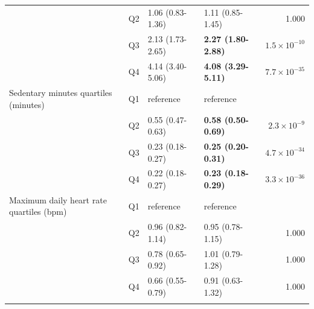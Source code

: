 \documentclass[11pt]{article}
\begin{document}
\begin{longtable}{@{}p{5.2cm}c p{3.0cm} p{3.0cm} r@{}}
 & Q2 & 1.06 (0.83-1.36) & 1.11 (0.85-1.45) & 1.000 \\
 & Q3 & 2.13 (1.73-2.65) & \textbf{2.27 (1.80-2.88)} & $1.5\times10^{-10}$ \\
 & Q4 & 4.14 (3.40-5.06) & \textbf{4.08 (3.29-5.11)} & $7.7\times10^{-35}$ \\
\addlinespace
Sedentary minutes quartiles (minutes) & Q1 & reference & reference & \\
 & Q2 & 0.55 (0.47-0.63) & \textbf{0.58 (0.50-0.69)} & $2.3\times10^{-9}$ \\
 & Q3 & 0.23 (0.18-0.27) & \textbf{0.25 (0.20-0.31)} & $4.7\times10^{-34}$ \\
 & Q4 & 0.22 (0.18-0.27) & \textbf{0.23 (0.18-0.29)} & $3.3\times10^{-36}$ \\
\addlinespace
Maximum daily heart rate quartiles (bpm) & Q1 & reference & reference & \\
 & Q2 & 0.96 (0.82-1.14) & 0.95 (0.78-1.15) & 1.000 \\
 & Q3 & 0.78 (0.65-0.92) & 1.01 (0.79-1.28) & 1.000 \\
 & Q4 & 0.66 (0.55-0.79) & 0.91 (0.63-1.32) & 1.000 \\
\addlinespace
\bottomrule \end{longtable}
\end{document}
